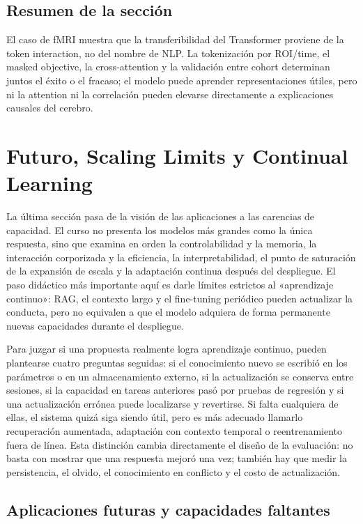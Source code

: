 \documentclass[a4paper]{article}
\begin{document}
\subsection{Resumen de la sección}

El caso de fMRI muestra que la transferibilidad del Transformer proviene de la token interaction, no del nombre de NLP. La tokenización por ROI/time, el masked objective, la cross-attention y la validación entre cohort determinan juntos el éxito o el fracaso; el modelo puede aprender representaciones útiles, pero ni la attention ni la correlación pueden elevarse directamente a explicaciones causales del cerebro.
\section{Futuro, Scaling Limits y Continual Learning}

La última sección pasa de la visión de las aplicaciones a las carencias de capacidad. El curso no presenta los modelos más grandes como la única respuesta, sino que examina en orden la controlabilidad y la memoria, la interacción corporizada y la eficiencia, la interpretabilidad, el punto de saturación de la expansión de escala y la adaptación continua después del despliegue. El paso didáctico más importante aquí es darle límites estrictos al «aprendizaje continuo»: RAG, el contexto largo y el fine-tuning periódico pueden actualizar la conducta, pero no equivalen a que el modelo adquiera de forma permanente nuevas capacidades durante el despliegue.

Para juzgar si una propuesta realmente logra aprendizaje continuo, pueden plantearse cuatro preguntas seguidas: si el conocimiento nuevo se escribió en los parámetros o en un almacenamiento externo, si la actualización se conserva entre sesiones, si la capacidad en tareas anteriores pasó por pruebas de regresión y si una actualización errónea puede localizarse y revertirse. Si falta cualquiera de ellas, el sistema quizá siga siendo útil, pero es más adecuado llamarlo recuperación aumentada, adaptación con contexto temporal o reentrenamiento fuera de línea. Esta distinción cambia directamente el diseño de la evaluación: no basta con mostrar que una respuesta mejoró una vez; también hay que medir la persistencia, el olvido, el conocimiento en conflicto y el costo de actualización.

\subsection{Aplicaciones futuras y capacidades faltantes}
\end{document}
